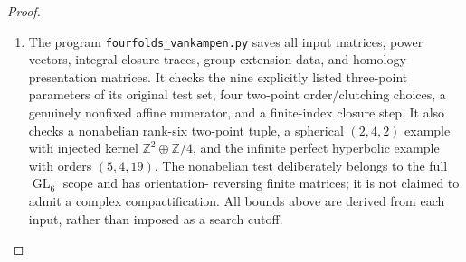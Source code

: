 \documentclass[11pt,a4paper]{article}
\theoremstyle{definition}
\begin{document}
\begin{proof}
\begin{enumerate}[label=\arabic*.]
\item The program \texttt{fourfolds\_vankampen.py} saves all input
matrices, power vectors, integral closure traces, group
extension data, and homology presentation matrices.
It checks the nine explicitly listed three-point parameters
of its original test set, four two-point order/clutching
choices, a genuinely nonfixed affine numerator, and a
finite-index closure step.  It also checks a nonabelian
rank-six two-point tuple, a spherical $(2,4,2)$ example
with injected kernel $\mathbb Z^2\oplus\mathbb Z/4$, and
the infinite perfect hyperbolic example with orders
$(5,4,19)$.  The nonabelian test deliberately belongs to
the full $\operatorname{GL}_6$ scope and has orientation-
reversing finite matrices; it is not claimed to admit a
complex compactification.  All bounds above are derived
from each input, rather than imposed as a search cutoff.

\end{enumerate}
\end{proof}
\end{document}
